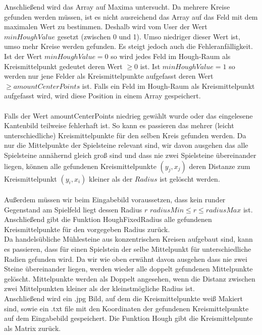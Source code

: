 \documentclass[paper=A4, deutsch]{scrartcl}
\begin{document}
Anschließend wird das Array auf Maxima untersucht. Da mehrere Kreise gefunden werden müssen, ist es nicht ausreichend das Array auf das Feld mit dem maximalen Wert zu bestimmen. Deshalb wird vom User der Wert \(minHoughValue\) gesetzt (zwischen 0 und 1). Umso niedriger dieser Wert ist, umso mehr Kreise werden gefunden. Es steigt jedoch auch die Fehleranfälligkeit. Ist der Wert \(minHoughValue = 0\) so wird jedes Feld im Hough-Raum als Kreismittelpunkt gedeutet deren Wert \(\geq 0\) ist. Ist \(minHoughValue = 1\) so werden nur jene Felder als Kreismittelpunkte aufgefasst deren Wert \(\geq amountCenterPoints\) ist.  Falls ein Feld im Hough-Raum als Kreismittelpunkt aufgefasst wird, wird diese Position in einem Array gespeichert. \\
\\
Falls der Wert amountCenterPoints niedrieg gewählt wurde oder das eingelesene Kantenbild teilweise fehlerhaft ist. So kann es passieren das mehrer (leicht unterschiedliche) Kreismittelpunkte für den selben Kreis gefunden werden. Da nur die Mittelpunkte der Spielsteine relevant sind, wir davon ausgehen das alle Spielsteine annähernd gleich groß sind und dass nie zwei Spielsteine übereinander liegen, können alle gefundenen Kreismittelpunkte \((y_{j}, x_{j})\) deren Distanze zum Kreismittelpunkt \((y_{i}, x_{i})\) kleiner als der \(Radius\) ist gelöscht werden. \\
\\
Außerdem müssen wir beim Eingabebild voraussetzen, dass kein runder Gegenstand am Spielfeld liegt dessen Radius \(r\)  \(radiusMin \leq r \leq radiusMax\) ist. 
Anschließend gibt die Funktion HoughFixedRadius alle gefundenen Kreismittelpunkte für den vorgegeben Radius zurück. \\

Da handelsübliche Mühlesteine aus konzentrischen Kreisen aufgebaut sind, kann es passieren, dass für einen Spielstein der selbe Mittelpunkt für unterschiedliche Radien gefunden wird.  Da wir wie oben erwähnt davon ausgehen dass nie zwei Steine übereinander liegen, werden wieder alle doppelt gefundenen Mittelpunkte gelöscht. Mittelpunkte werden als Doppelt angesehen, wenn die Distanz zwischen zwei Mittelpunkten kleiner als der kleinstmögliche Radius ist. \\

Anschließend wird ein .jpg Bild, auf dem die Kreismittelpunkte weiß Makiert sind, sowie ein .txt file mit den Koordinaten der gefundenen Kreismittelpunkte auf dem Eingabebild gespeichert. Die Funktion Hough gibt die Kreismittelpunte als Matrix zurück. \\ 
\end{document}
